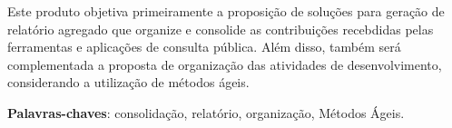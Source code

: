 \setlength{\absparsep}{18pt} %
\begin{resumo}
Este produto objetiva primeiramente a proposição de soluções para geração de relatório agregado que organize e consolide as contribuições recebdidas pelas ferramentas e aplicações de consulta pública. Além disso, também será complementada a proposta de organização das atividades de desenvolvimento, considerando a utilização de métodos ágeis.

 \noindent
 \textbf{Palavras-chaves}: consolidação, relatório, organização, Métodos Ágeis.
\end{resumo}
